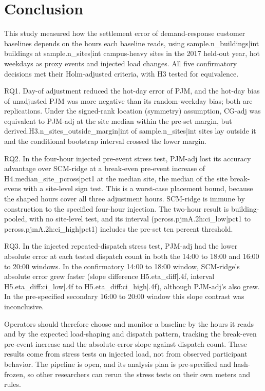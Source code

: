 \section{Conclusion}\label{sec:conclusion}

This study measured how the settlement error of demand-response customer baselines depends on the hours each baseline reads, using {{sample.n_buildings|int}} buildings at {{sample.n_sites|int}} campus-heavy sites in the 2017 held-out year, hot weekdays as proxy events and injected load changes. All five confirmatory decisions met their Holm-adjusted criteria, with H3 tested for equivalence.

RQ1. Day-of adjustment reduced the hot-day error of PJM, and the hot-day bias of unadjusted PJM was more negative than its random-weekday bias; both are replications. Under the signed-rank location (symmetry) assumption, CG-adj was equivalent to PJM-adj at the site median within the pre-set margin, but {{derived.H3.n_sites_outside_margin|int}} of {{sample.n_sites|int}} sites lay outside it and the conditional bootstrap interval crossed the lower margin.

RQ2. In the four-hour injected pre-event stress test, PJM-adj lost its accuracy advantage over SCM-ridge at a break-even pre-event increase of {{H4.median_site_pcross|pct1}} at the median site, the median of the site break-evens with a site-level sign test. This is a worst-case placement bound, because the shaped hours cover all three adjustment hours. SCM-ridge is immune by construction to the specified four-hour injection. The two-hour result is building-pooled, with no site-level test, and its interval ({{pcross.pjmA.2h:ci_low|pct1}} to {{pcross.pjmA.2h:ci_high|pct1}}) includes the pre-set ten percent threshold.

RQ3. In the injected repeated-dispatch stress test, PJM-adj had the lower absolute error at each tested dispatch count in both the 14:00 to 18:00 and 16:00 to 20:00 windows. In the confirmatory 14:00 to 18:00 window, SCM-ridge's absolute error grew faster (slope difference {{H5.eta_diff|.4f}}, interval {{H5.eta_diff:ci_low|.4f}} to {{H5.eta_diff:ci_high|.4f}}), although PJM-adj's also grew. In the pre-specified secondary 16:00 to 20:00 window this slope contrast was inconclusive.

Operators should therefore choose and monitor a baseline by the hours it reads and by the expected load-shaping and dispatch pattern, tracking the break-even pre-event increase and the absolute-error slope against dispatch count. These results come from stress tests on injected load, not from observed participant behavior. The pipeline is open, and its analysis plan is pre-specified and hash-frozen, so other researchers can rerun the stress tests on their own meters and rules.
